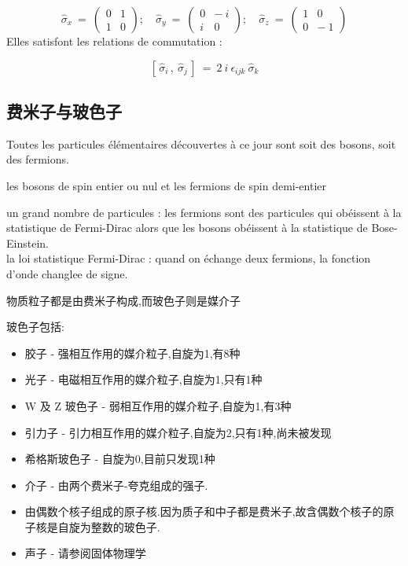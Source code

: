 \documentclass{article}
\begin{document}
$$
\hat{\sigma}_x  \ = \  
\begin{pmatrix} 
0 & 1 \\ 
1 & 0 
\end{pmatrix} ; 
\quad \hat{\sigma}_y  \ 
= \  
\begin{pmatrix} 
0 & - \ i \\ 
i & 0 
\end{pmatrix} ; 
\quad \hat{\sigma}_z  \ 
= \  
\begin{pmatrix} 
1 & 0 \\ 
0 & - \ 1 
\end{pmatrix}
$$
Elles satisfont les relations de commutation :

$$ \left[ \, \hat{\sigma}_i \, , \ \hat{\sigma}_j \, \right] \ = \  2 \ i \ \epsilon_{ijk} \ \hat{\sigma}_k $$

\subsection{费米子与玻色子}
Toutes les particules \'el\'ementaires d\'ecouvertes \`a ce jour sont soit des bosons, soit des fermions.\par

les bosons de spin entier ou nul et les fermions de spin demi-entier

un grand nombre de particules : les fermions sont des particules qui ob\'eissent \`a la statistique de Fermi-Dirac alors que les bosons ob\'eissent \`a la statistique de Bose-Einstein.\\
la loi statistique Fermi-Dirac : quand on \'echange deux fermions, la fonction d'onde changlee de signe.

物质粒子都是由费米子构成,而玻色子则是媒介子

玻色子包括:
\begin{itemize}
\item 胶子 - 强相互作用的媒介粒子,自旋为1,有8种
\item 光子 - 电磁相互作用的媒介粒子,自旋为1,只有1种
\item W 及 Z 玻色子 - 弱相互作用的媒介粒子,自旋为1,有3种
\item 引力子 - 引力相互作用的媒介粒子,自旋为2,只有1种,尚未被发现
\item 希格斯玻色子 - 自旋为0,目前只发现1种
\item 介子 - 由两个费米子-夸克组成的强子.
\item 由偶数个核子组成的原子核.因为质子和中子都是费米子,故含偶数个核子的原子核是自旋为整数的玻色子.
\item 声子 - 请参阅固体物理学
\end{itemize}
\end{document}
